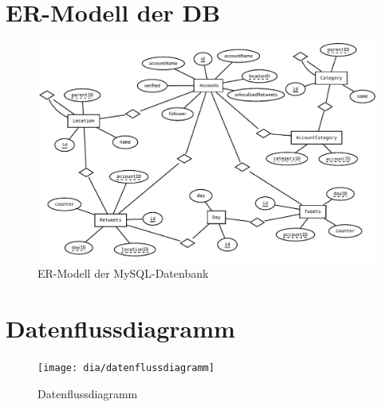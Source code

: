 \section{ER-Modell der DB}
\begin{figure}[h!]
	\centering
	\includegraphics[width=\textwidth,height=\textheight, keepaspectratio=true]{dia/er}
	\caption{ER-Modell der MySQL-Datenbank}
	\label{fig:mysql-er}
\end{figure}
\newpage
\section{Datenflussdiagramm}
\begin{figure}[h!]
	\centering
	\texttt{[image: dia/datenflussdiagramm]}
	\caption{Datenflussdiagramm}
	\label{fig:datenflussdiagramm}
\end{figure}
